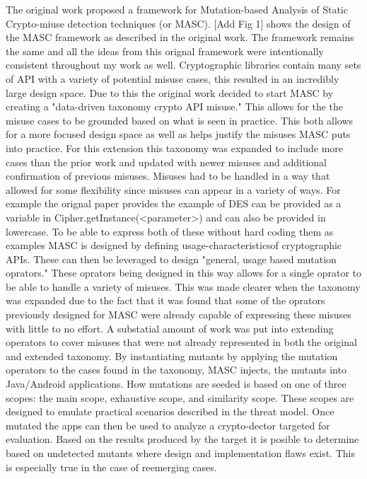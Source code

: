 The original work proposed a framework for Mutation-based Analysis of Static Crypto-miuse detection techniques (or MASC). [Add Fig 1] shows the design of the MASC framework as described in the original work. The framework remains the same and all the ideas from this orignal framework were intentionally consistent throughout my work as well. Cryptographic libraries contain many sets of API with a variety of potential misuse cases, this resulted in an incredibly large design space. Due to this the original work decided to start MASC by creating a "data-driven taxonomy crypto API misuse." This allows for the the misuse cases to be grounded based on what is seen in practice. This both allows for a more focused design space as well as helps justify the misuses MASC puts into practice. For this extension this taxonomy was expanded to include more cases than the prior work and updated with newer misuses and additional confirmation of previous misuses.
Misuses had to be handled in a way that allowed for some flexibility since misuses can appear in a variety of ways. For example the orignal paper provides the example of DES can be provided as a variable in Cipher.getInstance(<parameter>) and can also be provided in lowercase. To be able to express both of these without hard coding them as examples MASC is designed by defining usage-characteristicsof cryptographic APIs. These can then be leveraged to design "general, usage based mutation oprators." These oprators being designed in this way allows for a single oprator to be able to handle a variety of misuses. This was made clearer when the taxonomy was expanded due to the fact that it was found that some of the oprators previously designed for MASC were already capable of expressing these misuses with little to no effort. A substatial amount of work was put into extending operators to cover misuses that were not already represented in both the original and extended taxonomy.
By instantiating mutants by applying the mutation operators to the cases found in the taxonomy, MASC injects, the mutants into Java/Android applications. How mutations are seeded is based on one of three scopes: the main scope, exhaustive scope, and similarity scope. These scopes are designed to emulate practical scenarios described in the threat model. Once mutated the apps can then be used to analyze a crypto-dector targeted for evaluation. Based on the results produced by the target it is posible to determine based on undetected mutants where design and implementation flaws exist. This is especially true in the case of reemerging cases.

